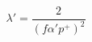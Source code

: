 \begin{equation}
\lambda'= \frac{2}{ \left( f\alpha'
p^+\right)^2}
\label{lambdaprime1}
\end{equation}

